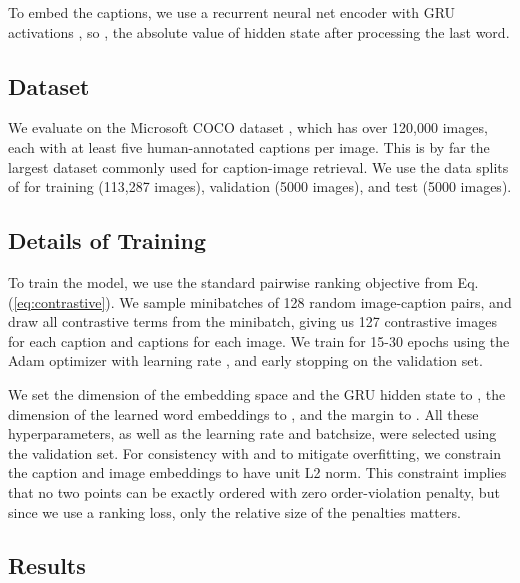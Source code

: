 \documentclass{article} \usepackage{iclr2016_conference,times}
\begin{document}
To embed the captions, we use a recurrent neural net encoder with GRU activations \citep{gru}, so , the absolute value of hidden state after processing the last word. 


\subsection{Dataset}


We evaluate on the Microsoft COCO dataset \citep{coco}, which has over 120,000 images, each with at least five human-annotated captions per image. This is by far the largest dataset commonly used for caption-image retrieval. We use the data splits of \citet{karpathydeep} for training (113,287 images), validation (5000 images), and test (5000 images).

\subsection{Details of Training}


To train the model, we use the standard pairwise ranking objective from Eq.  (\ref{eq:contrastive}). We sample minibatches of 128 random image-caption pairs, and draw all contrastive terms from the minibatch, giving us 127 contrastive images for each caption and captions for each image. We train for 15-30 epochs using the Adam optimizer with learning rate , and early stopping on the validation set.

We set the dimension of the embedding space and the GRU hidden state  to , the dimension of the learned word embeddings to ,  and the margin  to . All these hyperparameters, as well as the learning rate and batchsize, were selected using the validation set. For consistency with \citet{kiros2014} and to mitigate overfitting, we constrain the caption and image embeddings to have unit L2 norm. This constraint implies that no two points can be exactly ordered with zero order-violation penalty, but since we use a ranking loss, only the relative size of the penalties matters.

\subsection{Results}
\end{document}
